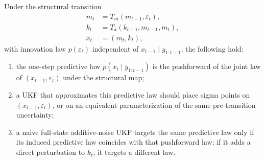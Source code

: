 \begin{proposition}
\label{prop:bf-structural-ukf-pushforward}
Under the structural transition
\begin{align}
  m_t &= T_m(m_{t-1},\varepsilon_t),
    \label{eq:bf-structural-ukf-prop-m}\\
  k_t &= T_k(k_{t-1},m_{t-1},m_t),
    \label{eq:bf-structural-ukf-prop-k}\\
  x_t &= (m_t,k_t),
    \label{eq:bf-structural-ukf-prop-state}
\end{align}
with innovation law $p(\varepsilon_t)$ independent of
$x_{t-1}\mid y_{1:t-1}$, the following hold:
\begin{enumerate}[label=(\roman*)]
  \item the one-step predictive law $p(x_t\mid y_{1:t-1})$ is the pushforward
    of the joint law of $(x_{t-1},\varepsilon_t)$ under the structural map;
  \item a UKF that approximates this predictive law should place sigma points on
    $(x_{t-1},\varepsilon_t)$, or on an equivalent parameterization of the same
    pre-transition uncertainty;
  \item a naive full-state additive-noise UKF targets the same predictive law
    only if its induced predictive law coincides with that pushforward law; if
    it adds a direct perturbation to $k_t$, it targets a different law.
\end{enumerate}
\end{proposition}

